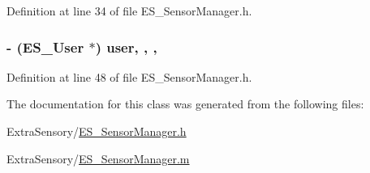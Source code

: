 Definition at line 34 of file E\+S\+\_\+\+Sensor\+Manager.\+h.

\hypertarget{interface_e_s___sensor_manager_a487cebc582f9d0fb56c4a4650cf61f1d}{
\subsubsection[{user}]{\setlength{\rightskip}{0pt plus 5cm}-\/ ({\bf E\+S\+\_\+\+User} $\ast$) user\hspace{0.3cm}{\ttfamily [read]}, {\ttfamily [write]}, {\ttfamily [nonatomic]}, {\ttfamily [weak]}}}\label{interface_e_s___sensor_manager_a487cebc582f9d0fb56c4a4650cf61f1d}


Definition at line 48 of file E\+S\+\_\+\+Sensor\+Manager.\+h.



The documentation for this class was generated from the following files\+:\begin{DoxyCompactItemize}
\item 
Extra\+Sensory/\hyperlink{_e_s___sensor_manager_8h}{E\+S\+\_\+\+Sensor\+Manager.\+h}\item 
Extra\+Sensory/\hyperlink{_e_s___sensor_manager_8m}{E\+S\+\_\+\+Sensor\+Manager.\+m}\end{DoxyCompactItemize}
